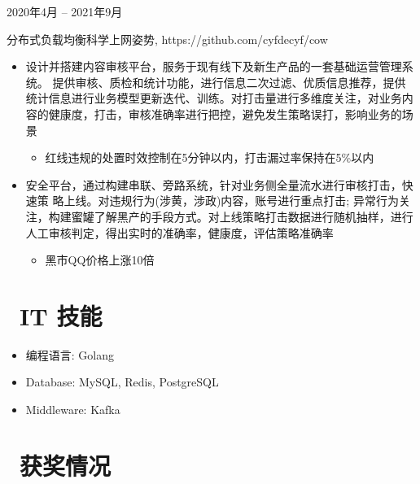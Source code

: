\documentclass{resume}
\begin{document}
 {2020年4月 -- 2021年9月}
\begin{onehalfspacing}
分布式负载均衡科学上网姿势, https://github.com/cyfdecyf/cow
\begin{itemize}
  \item 设计并搭建内容审核平台，服务于现有线下及新生产品的一套基础运营管理系统。 提供审核、质检和统计功能，进行信息二次过滤、优质信息推荐，提供统计信息进行业务模型更新迭代、训练。对打击量进行多维度关注，对业务内容的健康度，打击，审核准确率进行把控，避免发生策略误打，影响业务的场景
  \begin{itemize}
    \item 红线违规的处置时效控制在5分钟以内，打击漏过率保持在5\%以内
  \end{itemize}
  \item 安全平台，通过构建串联、旁路系统，针对业务侧全量流水进行审核打击，快速策 略上线。对违规行为(涉黄，涉政)内容，账号进行重点打击; 异常行为关注，构建蜜罐了解黑产的手段方式。对上线策略打击数据进行随机抽样，进行人工审核判定，得出实时的准确率，健康度，评估策略准确率
  \begin{itemize}
    \item 黑市QQ价格上涨10倍
  \end{itemize}
\end{itemize}
\end{onehalfspacing}



\section{\faCogs\ IT 技能}
\begin{itemize}[parsep=0.5ex]
  \item 编程语言: Golang
  \item Database: MySQL, Redis, PostgreSQL
  \item Middleware: Kafka
\end{itemize}

\section{\faHeartO\ 获奖情况}
\end{document}
